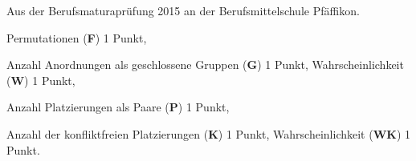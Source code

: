 \begin{diskussion}
Aus der Berufsmaturaprüfung 2015 an der Berufsmittelschule Pfäffikon.
\end{diskussion}

\begin{bewertung}
\begin{teilaufgaben}
\item Permutationen ({\bf F}) 1 Punkt,
\item Anzahl Anordnungen als geschlossene Gruppen ({\bf G}) 1 Punkt,
Wahrscheinlichkeit ({\bf W}) 1 Punkt,
\item Anzahl Platzierungen als Paare ({\bf P}) 1 Punkt,
\item Anzahl der konfliktfreien Platzierungen ({\bf K}) 1 Punkt,
Wahrscheinlichkeit ({\bf WK}) 1 Punkt.
\end{teilaufgaben}
\end{bewertung}

